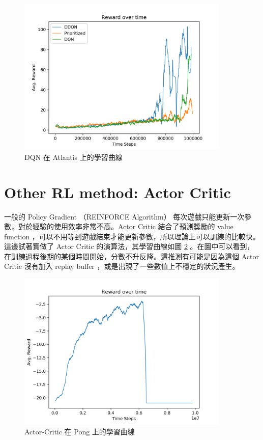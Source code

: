 \documentclass[fleqn,a4paper,12pt]{article}
\begin{document}
\begin{figure}[h]
  \centering
  \includegraphics[width=0.9\textwidth]{figures/atlantis.png}
  \caption{DQN 在 Atlantis 上的學習曲線}
  \label{fig:learning-curve-dqn-atlantis}
\end{figure}




\section{Other RL method: Actor Critic}

一般的 Policy Gradient （REINFORCE Algorithm） 每次遊戲只能更新一次參數，對於經驗的使用效率非常不高。Actor Critic 結合了預測獎勵的 value function ，可以不用等到遊戲結束才能更新參數，所以理論上可以訓練的比較快。這邊試著實做了 Actor Critic 的演算法，其學習曲線如圖 \ref{fig:learning-curve-actor-critic} 。在圖中可以看到，在訓練過程後期的某個時間開始，分數不升反降。這推測有可能是因為這個 Actor Critic 沒有加入 replay buffer ，或是出現了一些數值上不穩定的狀況產生。

\begin{figure}[h]
  \centering
  \includegraphics[width=0.9\textwidth]{figures/actor-critic.png}
  \caption{Actor-Critic 在 Pong 上的學習曲線}
  \label{fig:learning-curve-actor-critic}
\end{figure}
\end{document}
